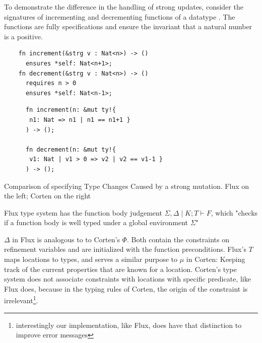 \documentclass[twoside, english]{sdqthesis}
\theoremstyle{definition}
\begin{document}
To demonstrate the difference in the handling of strong updates, consider the signatures of incrementing and decrementing functions of a datatype . The functions are fully specifications and ensure the invariant that a natural number is a positive.

\begin{listing}[ht]
  \begin{minipage}[t]{0.48\linewidth}
    
    \begin{verbatim}
    fn increment(&strg v : Nat<n>) -> ()
      ensures *self: Nat<n+1>;
    fn decrement(&strg v : Nat<n>) -> ()
      requires n > 0
      ensures *self: Nat<n-1>;
    \end{verbatim}
  \end{minipage}
  \begin{minipage}[t]{0.48\linewidth}
    \begin{verbatim}
      fn increment(n: &mut ty!{
       n1: Nat => n1 | n1 == n1+1 }
      ) -> ();

      fn decrement(n: &mut ty!{ 
       v1: Nat | v1 > 0 => v2 | v2 == v1-1 }
      ) -> ();
    \end{verbatim}
  \end{minipage}
  
  \caption{Comparison of specifying Type Changes Caused by a strong mutation. Flux on the left; Corten on the right}
  \label{lst:compare-flux-strong-updates}
\end{listing}

Flux type system has the function body judgement $\Sigma, \Delta \mid K;T \vdash F$, which "checks if a function body is well typed under a global environment $\Sigma$" \cite[p. 11]{lehmann_flux_2022}

$\Delta$ in Flux is analogous to to Corten's $\Phi$. Both contain the constraints on refinement variables and are initialized with the function preconditions. 
Flux's $T$ maps locations to types, and serves a similar purpose to $\mu$ in Corten: Keeping track of the current properties that are known for a location. Corten's type system does not associate constraints with locations with specific predicate, like Flux does, because in the typing rules of Corten, the origin of the constraint is irrelevant\footnote{interestingly our implementation, like Flux, does have that distinction to improve error messages}.
\end{document}
